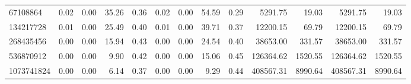 \begin{tabular}{lrrrrrrrrrrrr}
67108864   &        0.02 &        0.00 &         35.26 &          0.36 &           0.02 &           0.00 &        54.59 &         0.29 &          5291.75 &            19.03 &         5291.75 &           19.03 \\
134217728  &        0.01 &        0.00 &         25.49 &          0.40 &           0.01 &           0.00 &        39.71 &         0.37 &         12200.15 &            69.79 &        12200.15 &           69.79 \\
268435456  &        0.00 &        0.00 &         15.94 &          0.43 &           0.00 &           0.00 &        24.54 &         0.40 &         38653.00 &           331.57 &        38653.00 &          331.57 \\
536870912  &        0.00 &        0.00 &          9.90 &          0.42 &           0.00 &           0.00 &        15.06 &         0.45 &        126364.62 &          1520.55 &       126364.62 &         1520.55 \\
1073741824 &        0.00 &        0.00 &          6.14 &          0.37 &           0.00 &           0.00 &         9.29 &         0.44 &        408567.31 &          8990.64 &       408567.31 &         8990.64 \\
\bottomrule
\end{tabular}
